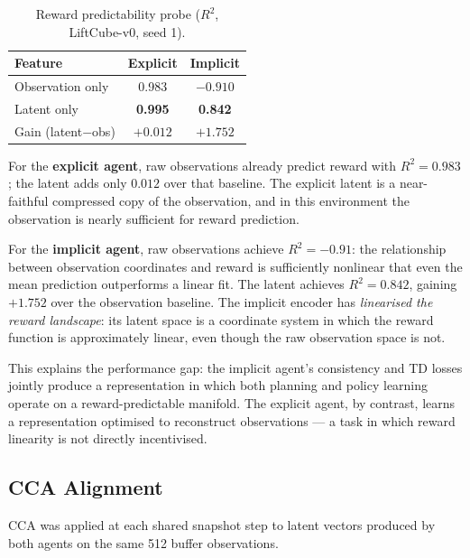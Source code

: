 \documentclass{article}
\begin{document}
\begin{table}[h]
\caption{Reward predictability probe ($R^2$, LiftCube-v0, seed 1).}
\label{tab:reward}
\vskip 0.1in
\begin{center}
\begin{small}
\begin{sc}
\begin{tabular}{lcc}
\toprule
Feature             & Explicit  & Implicit \\
\midrule
Observation only    & 0.983     & $-0.910$ \\
Latent only         & \textbf{0.995} & \textbf{0.842} \\
Gain (latent$-$obs) & $+0.012$  & $+1.752$ \\
\bottomrule
\end{tabular}
\end{sc}
\end{small}
\end{center}
\vskip -0.1in
\end{table}

For the \textbf{explicit agent}, raw observations already predict reward with $R^2 =
0.983$; the latent adds only $0.012$ over that baseline.
The explicit latent is a near-faithful compressed copy of the observation, and in this
environment the observation is nearly sufficient for reward prediction.

For the \textbf{implicit agent}, raw observations achieve $R^2 = -0.91$: the
relationship between observation coordinates and reward is sufficiently nonlinear that
even the mean prediction outperforms a linear fit.
The latent achieves $R^2 = 0.842$, gaining $+1.752$ over the observation baseline.
The implicit encoder has \emph{linearised the reward landscape}: its latent space is a
coordinate system in which the reward function is approximately linear, even though the
raw observation space is not.

This explains the performance gap: the implicit agent's consistency and TD losses
jointly produce a representation in which both planning and policy learning operate on
a reward-predictable manifold.
The explicit agent, by contrast, learns a representation optimised to reconstruct
observations — a task in which reward linearity is not directly incentivised.

\subsection{CCA Alignment}

CCA was applied at each shared snapshot step to latent vectors produced by both agents
on the same 512 buffer observations.
\end{document}
